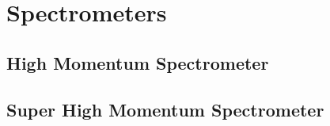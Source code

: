 \section{Spectrometers}
\lipsum[1-2]

\subsection{High Momentum Spectrometer}
\lipsum[1-2]

\subsection{Super High Momentum Spectrometer}
\lipsum[1-2]
